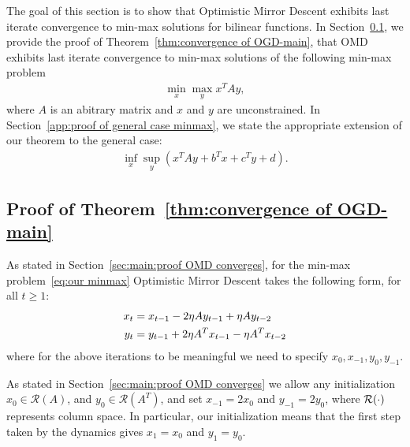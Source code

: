  \label{sec:bilinear OMD convergence}

The goal of this section is to show that Optimistic Mirror Descent exhibits last iterate convergence to min-max solutions for bilinear functions. In Section~\ref{app:proof of special case minmax}, we provide the proof of Theorem~\ref{thm:convergence of OGD-main}, that OMD exhibits last iterate convergence to min-max solutions of the following min-max problem
\begin{align}
 \min_x \max_y x^T A y, \label{eq:our minmax}
\end{align}
where $A$ is an abitrary matrix and $x$ and $y$ are unconstrained. In Section~\ref{app:proof of general case minmax}, we state the appropriate extension of our theorem to the general case:
\begin{align}
    \inf_{x} \sup_{y} \left(x^TAy + b^Tx + c^Ty + d\right). \label{eq:general inf sup}
\end{align}

\subsection{Proof of Theorem~\ref{thm:convergence of OGD-main}} \label{app:proof of special case minmax}

\smallskip As stated in Section~\ref{sec:main:proof OMD converges}, for the min-max problem~\eqref{eq:our minmax}
%
Optimistic Mirror Descent takes the following form, for all $t \ge 1$:
\begin{align}
    x_{t} &= {}x_{t{-1}} - 2\eta{}Ay_{t{-1}} + \eta{}Ay_{t{-2}} \label{eq:OGD bilinear x}\\
    y_{t} &= {}y_{t{-1}} + 2\eta{}A^Tx_{t{-1}} - \eta{}A^Tx_{t{-2}}  \label{eq:OGD bilinear y}
\end{align}
where for the above iterations to be meaningful we need to specify $x_0,x_{-1},y_0,y_{-1}$. 

\smallskip As stated in Section~\ref{sec:main:proof OMD converges} we allow any initialization $x_0 \in \mathcal{R}(A)$, and $y_0\in\mathcal{R}(A^T)$, and set $x_{-1}=2x_0$ and $y_{-1}=2y_{0}$, where ${\cal R}(\cdot)$ represents column space. In particular, our initialization means that the first step taken by the dynamics gives $x_1=x_0$ and $y_1=y_0$.

